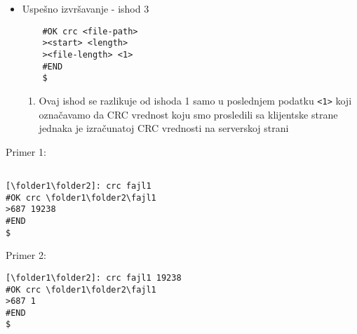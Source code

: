 \documentclass[a4paper]{extarticle}
\begin{document}
\begin{itemize}
	\item Uspešno izvršavanje - ishod 3\\
	\begin{verbatim}
	#OK crc <file-path>
	><start> <length>
	><file-length> <1>
	#END
	$
	\end{verbatim}
	\begin{enumerate}
		\item Ovaj ishod se razlikuje od ishoda 1 samo u poslednjem podatku \verb|<1>| koji označavamo da CRC vrednost koju smo prosledili sa klijentske strane  jednaka je izračunatoj CRC vrednosti na serverskoj strani
	\end{enumerate}
	
	
\end{itemize}
Primer 1:
\begin{verbatim}

[\folder1\folder2]: crc fajl1
#OK crc \folder1\folder2\fajl1
>687 19238
#END
$

\end{verbatim}
Primer 2:
\begin{verbatim}
[\folder1\folder2]: crc fajl1 19238
#OK crc \folder1\folder2\fajl1
>687 1
#END
$
\end{verbatim}
\end{document}
